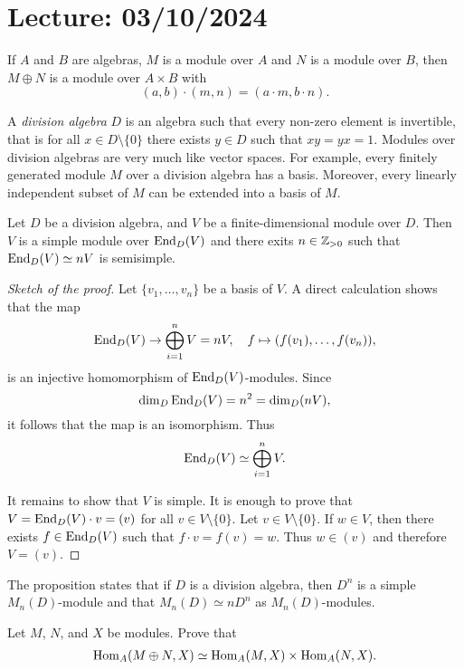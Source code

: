 \section{Lecture: 03/10/2024}


\begin{exercise}
If $A$ and $B$ are algebras, $M$ is a module over $A$ and $N$ is a module over $B$, then 
    $M\oplus N$ is a module over $A\times B$ with 
    \[
    (a,b)\cdot (m,n)=(a\cdot m,b\cdot n).
    \]
\end{exercise}


A \emph{division algebra} $D$ is an algebra such that every non-zero element 
is invertible, that is for all $x\in D\setminus\{0\}$ there exists $y\in D$ such that $xy=yx=1$.  
Modules over division algebras are very much like vector spaces.  For example, 
every finitely generated module $M$ over a division algebra has a basis. 
Moreover, every linearly independent subset of
$M$ can be extended into a basis of $M$. 

\begin{proposition}
	Let $D$ be a division algebra, and $V$ be a finite-dimensional module over $D$. Then 
	$V$ is a simple module over $\operatorname{End}_D(V)$ and there exits $n\in\mathbb{Z}_{>0}$ such that  
	$\operatorname{End}_D(V)\simeq nV$ is semisimple.
\end{proposition}

\begin{proof}[Sketch of the proof]
	Let $\{v_1,\dots,v_n\}$ be a basis of $V$. A direct calculation shows that the map 
	\[
		\operatorname{End}_D(V)\to\bigoplus_{i=1}^nV=nV,\quad
		f\mapsto (f(v_1),\dots,f(v_n)),
	\]
	is an injective homomorphism of $\operatorname{End}_D(V)$-modules.
	Since
	\[
	\dim_D\operatorname{End}_D(V)=n^2=\dim_D(nV),
	\]
	it follows that the map is an isomorphism. 
	Thus 
	\[
		\operatorname{End}_D(V)\simeq \bigoplus_{i=1}^nV.
	\]
	
	It remains to show that $V$ is simple. It is enough to prove that $V=\operatorname{End}_D(V)\cdot v=(v)$ 
	for all $v\in V\setminus\{0\}$. Let $v\in V\setminus\{0\}$. If $w\in V$, then 
	there exists $f\in\operatorname{End}_D(V)$ such that $f\cdot v=f(v)=w$. 
	Thus $w\in (v)$ and therefore $V=(v)$.  
\end{proof}

The proposition states that if $D$ is a division algebra, then  
$D^{n}$ is a simple $M_n(D)$-module and that $M_n(D)\simeq n D^n$ as $M_n(D)$-modules. 

\begin{exercise}
    Let $M$, $N$, and $X$ be modules. Prove that 
    \begin{align}
        \operatorname{Hom}_A(M\oplus N,X)\simeq\operatorname{Hom}_A(M,X)\times\operatorname{Hom}_A(N,X).
    \end{align}
\end{exercise}

